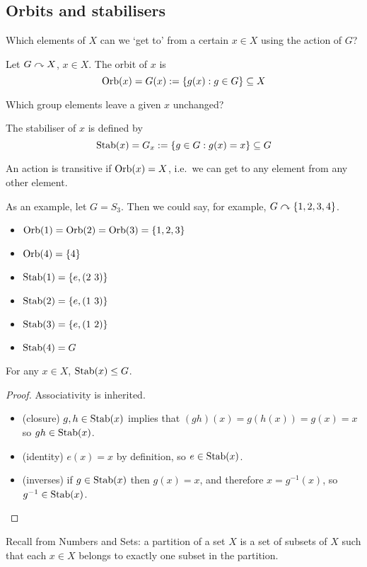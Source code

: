 \subsection{Orbits and stabilisers}
Which elements of \(X\) can we `get to' from a certain \(x \in X\) using the action of \(G\)?
\begin{definition}
	Let \(G \curvearrowright X\), \(x \in X\).
	The orbit of \(x\) is
	\[
		\operatorname{Orb} (x) = G(x) := \{ g(x) : g \in G \} \subseteq X
	\]
\end{definition}
Which group elements leave a given \(x\) unchanged?
\begin{definition}
	The stabiliser of \(x\) is defined by
	\[
		\operatorname{Stab}(x) = G_x := \{ g \in G : g(x) = x \} \subseteq G
	\]
\end{definition}
\begin{definition}
	An action is transitive if \(\operatorname{Orb}(x) = X\), i.e.\ we can get to any element from any other element.
\end{definition}
As an example, let \(G = S_3\).
Then we could say, for example, \(G \curvearrowright \{ 1, 2, 3, 4 \}\).
\begin{itemize}
	\item \(\operatorname{Orb}(1) = \operatorname{Orb}(2) = \operatorname{Orb}(3) = \{ 1, 2, 3 \}\)
	\item \(\operatorname{Orb}(4) = \{ 4 \}\)
	\item \(\operatorname{Stab}(1) = \{ e, (2\ 3) \}\)
	\item \(\operatorname{Stab}(2) = \{ e, (1\ 3) \}\)
	\item \(\operatorname{Stab}(3) = \{ e, (1\ 2) \}\)
	\item \(\operatorname{Stab}(4) = G\)
\end{itemize}
\begin{lemma}
	For any \(x \in X\), \(\operatorname{Stab}(x) \leq G\).
\end{lemma}
\begin{proof}
	Associativity is inherited.
	\begin{itemize}
		\item (closure) \(g, h \in \operatorname{Stab}(x)\) implies that \((gh)(x) = g(h(x)) = g(x) = x\) so \(gh \in \operatorname{Stab}(x)\).
		\item (identity) \(e(x) = x\) by definition, so \(e \in \operatorname{Stab}(x)\).
		\item (inverses) if \(g \in \operatorname{Stab}(x)\) then \(g(x) = x\), and therefore \(x = g^{-1}(x)\), so \(g^{-1} \in \operatorname{Stab}(x)\).
	\end{itemize}
\end{proof}
Recall from Numbers and Sets: a partition of a set \(X\) is a set of subsets of \(X\) such that each \(x \in X\) belongs to exactly one subset in the partition.
